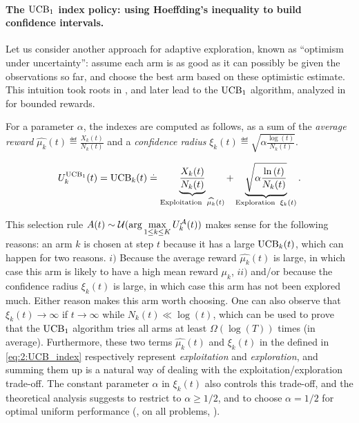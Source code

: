 \paragraph{The $\mathrm{UCB}_1$ index policy: using Hoeffding's inequality to build confidence intervals.}
%
Let us consider another approach for adaptive exploration, known as ``optimism under uncertainty'': assume each arm is as good as it can possibly be given the observations so far, and choose the best arm based on these optimistic estimate.
%
This intuition took roots in \cite{LaiRobbins85}, and later lead to the $\mathrm{UCB}_1$ algorithm, analyzed in \cite{Auer02} for bounded rewards.

For a parameter $\alpha$, the \UCB{} indexes are computed as follows, as a sum of
the \emph{average reward} $\widehat{\mu_k}(t) \eqdef \frac{X_k(t)}{N_k(t)}$
and a \emph{confidence radius} $\xi_k(t) \eqdef \sqrt{\alpha \frac{\log\left(t\right)}{N_k(t)}}$.

\begin{align}\label{eq:2:UCB_index}
    U_k^{\mathrm{UCB}_1}(t) = \mathrm{UCB}_k(t) \overset{.}{=} \underbrace{\frac{X_k(t)}{N_k(t)}}_{\text{Exploitation }\; \widehat{\mu_k}(t)} + \underbrace{\sqrt{\alpha \frac{\ln\left(t\right)}{N_k(t)}}}_{\text{Exploration }\; \xi_k(t)}.
\end{align}

This selection rule $A(t) \sim \mathcal{U}(\arg\max\limits_{1\leq k \leq K} U_k^{\mathcal{A}}(t))$ makes sense for the following reasons:
an arm $k$ is chosen at step $t$ because it has a large $\mathrm{UCB}_k(t)$, which can happen for two reasons.
$i)$ Because the average reward $\widehat{\mu_k}(t)$ is large, in which case this arm is likely to have a high mean reward $\mu_k$,
$ii)$ and/or because the confidence radius $\xi_k(t)$ is large, in which case this arm has not been explored much.
Either reason makes this arm worth choosing.
One can also observe that $\xi_k(t)\to\infty$ if $t\to\infty$ while $N_k(t)\ll\log(t)$, which can be used to prove that the $\mathrm{UCB}_1$ algorithm tries all arms at least $\Omega(\log(T))$ times (in average).
%
Furthermore, these two terms $\widehat{\mu_k}(t)$ and $\xi_k(t)$ in the \UCB{} defined in \eqref{eq:2:UCB_index} respectively represent \emph{exploitation} and \emph{exploration}, and summing them up is a natural way of dealing with the exploitation/exploration trade-off.
The constant parameter $\alpha$ in $\xi_k(t)$ also controls this trade-off, and the theoretical analysis suggests to restrict to $\alpha\geq1/2$, and to choose $\alpha=1/2$ for optimal uniform performance (\ie, on all problems, \cite{Auer02}).

